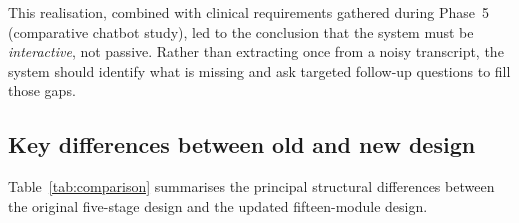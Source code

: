 \documentclass[12pt,a4paper]{article}
\begin{document}
This realisation, combined with clinical requirements gathered during
Phase~5 (comparative chatbot study), led to the conclusion that the
system must be \textit{interactive}, not passive. Rather than extracting
once from a noisy transcript, the system should identify what is
missing and ask targeted follow-up questions to fill those gaps.

\subsection{Key differences between old and new design}

Table~\ref{tab:comparison} summarises the principal structural
differences between the original five-stage design and the updated
fifteen-module design.

\renewcommand{\arraystretch}{1.3}
\footnotesize
\end{document}
